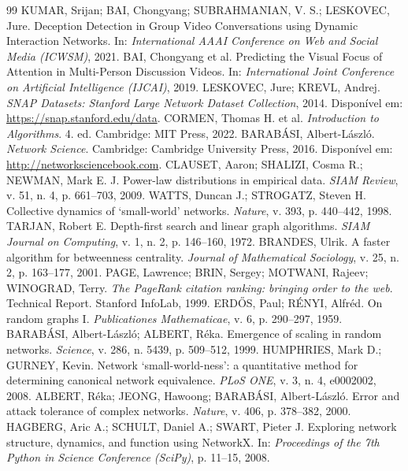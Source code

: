 \documentclass[sigconf]{webmedia}
\begin{document}
\begin{thebibliography}{99}
 KUMAR, Srijan; BAI, Chongyang; SUBRAHMANIAN, V. S.; LESKOVEC, Jure. Deception Detection in Group Video Conversations using Dynamic Interaction Networks. In: \textit{International AAAI Conference on Web and Social Media (ICWSM)}, 2021.
 BAI, Chongyang et al. Predicting the Visual Focus of Attention in Multi-Person Discussion Videos. In: \textit{International Joint Conference on Artificial Intelligence (IJCAI)}, 2019.
 LESKOVEC, Jure; KREVL, Andrej. \textit{SNAP Datasets: Stanford Large Network Dataset Collection}, 2014. Disponível em: \url{https://snap.stanford.edu/data}.
 CORMEN, Thomas H. et al. \textit{Introduction to Algorithms}. 4. ed. Cambridge: MIT Press, 2022.
 BARABÁSI, Albert-László. \textit{Network Science}. Cambridge: Cambridge University Press, 2016. Disponível em: \url{http://networksciencebook.com}.
 CLAUSET, Aaron; SHALIZI, Cosma R.; NEWMAN, Mark E. J. Power-law distributions in empirical data. \textit{SIAM Review}, v. 51, n. 4, p. 661--703, 2009.
 WATTS, Duncan J.; STROGATZ, Steven H. Collective dynamics of `small-world' networks. \textit{Nature}, v. 393, p. 440--442, 1998.
 TARJAN, Robert E. Depth-first search and linear graph algorithms. \textit{SIAM Journal on Computing}, v. 1, n. 2, p. 146--160, 1972.
 BRANDES, Ulrik. A faster algorithm for betweenness centrality. \textit{Journal of Mathematical Sociology}, v. 25, n. 2, p. 163--177, 2001.
 PAGE, Lawrence; BRIN, Sergey; MOTWANI, Rajeev; WINOGRAD, Terry. \textit{The PageRank citation ranking: bringing order to the web}. Technical Report. Stanford InfoLab, 1999.
 ERDŐS, Paul; RÉNYI, Alfréd. On random graphs I. \textit{Publicationes Mathematicae}, v. 6, p. 290--297, 1959.
 BARABÁSI, Albert-László; ALBERT, Réka. Emergence of scaling in random networks. \textit{Science}, v. 286, n. 5439, p. 509--512, 1999.
 HUMPHRIES, Mark D.; GURNEY, Kevin. Network `small-world-ness': a quantitative method for determining canonical network equivalence. \textit{PLoS ONE}, v. 3, n. 4, e0002002, 2008.
 ALBERT, Réka; JEONG, Hawoong; BARABÁSI, Albert-László. Error and attack tolerance of complex networks. \textit{Nature}, v. 406, p. 378--382, 2000.
 HAGBERG, Aric A.; SCHULT, Daniel A.; SWART, Pieter J. Exploring network structure, dynamics, and function using NetworkX. In: \textit{Proceedings of the 7th Python in Science Conference (SciPy)}, p. 11--15, 2008.
\end{thebibliography}
\end{document}
